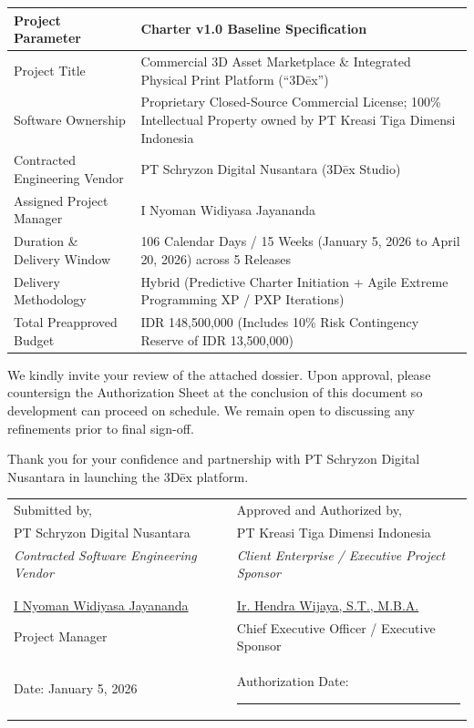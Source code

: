 \documentclass[11pt,a4paper]{article}
\newcommand{\thdr}[1]{\centering\arraybackslash\textbf{#1}}
\begin{document}
\vspace*{2pt}
\noindent
\begin{tabularx}{\textwidth}{| L{4.8cm} | Y |}
\hline
{} \thdr{Project Parameter} & \thdr{Charter v1.0 Baseline Specification} \\
\hline
Project Title & Commercial 3D Asset Marketplace \& Integrated Physical Print Platform (``3D\={e}x'') \\
\hline
Software Ownership & Proprietary Closed-Source Commercial License; 100\% Intellectual Property owned by PT Kreasi Tiga Dimensi Indonesia \\
\hline
Contracted Engineering Vendor & PT Schryzon Digital Nusantara (3D\={e}x Studio) \\
\hline
Assigned Project Manager & I Nyoman Widiyasa Jayananda \\
\hline
Duration \& Delivery Window & 106 Calendar Days / 15 Weeks (January 5, 2026 to April 20, 2026) across 5 Releases \\
\hline
Delivery Methodology & Hybrid (Predictive Charter Initiation + Agile Extreme Programming XP / PXP Iterations) \\
\hline
Total Preapproved Budget & IDR 148,500,000 (Includes 10\% Risk Contingency Reserve of IDR 13,500,000) \\
\hline
\end{tabularx}
\vspace{6pt}

We kindly invite your review of the attached dossier. Upon approval, please countersign the Authorization Sheet at the conclusion of this document so development can proceed on schedule. We remain open to discussing any refinements prior to final sign-off.

Thank you for your confidence and partnership with PT Schryzon Digital Nusantara in launching the 3D\={e}x platform.

\vspace{8pt}

\noindent
\begin{tabularx}{\textwidth}{@{} Y L{0.8cm} Y @{}}
Submitted by, & & Approved and Authorized by, \\
PT Schryzon Digital Nusantara & & PT Kreasi Tiga Dimensi Indonesia \\
\textit{Contracted Software Engineering Vendor} & & \textit{Client Enterprise / Executive Project Sponsor} \\
& & \\
& & \\
\underline{I Nyoman Widiyasa Jayananda} & & \underline{Ir. Hendra Wijaya, S.T., M.B.A.} \\
Project Manager & & Chief Executive Officer / Executive Sponsor \\
Date: January 5, 2026 & & Authorization Date: \rule{3.2cm}{0.4pt} \\
\end{tabularx}
\end{document}
